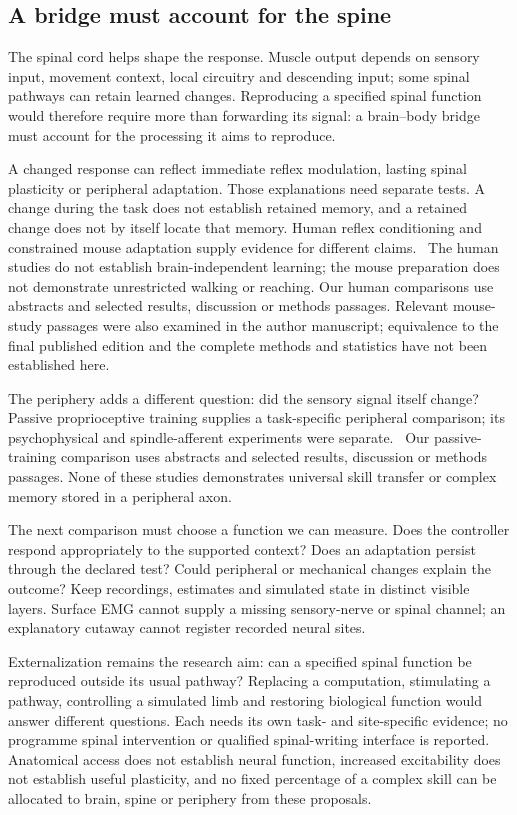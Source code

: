 \subsection{A bridge must account for the spine}

The spinal cord helps shape the response. Muscle output depends on sensory
input, movement context, local circuitry and descending input; some spinal
pathways can retain learned changes. Reproducing a specified spinal function
would therefore require more than forwarding its signal: a brain--body bridge
must account for the processing it aims to reproduce.

A changed response can reflect immediate reflex modulation, lasting spinal
plasticity or peripheral adaptation. Those explanations need separate tests.
A change during the task does not establish retained memory, and a retained
change does not by itself locate that memory. Human reflex conditioning and
constrained mouse adaptation supply evidence for different claims.~\cite{thompson2009retained,thompson2013retained,lavaud2024}
The human studies do not establish brain-independent learning; the mouse
preparation does not demonstrate unrestricted walking or reaching. Our human
comparisons use abstracts and selected results, discussion or methods passages.
Relevant mouse-study passages were also examined in the author manuscript;
equivalence to the final published edition and the complete methods and
statistics have not been established here.

The periphery adds a different question: did the sensory signal itself change?
Passive proprioceptive training supplies a task-specific peripheral comparison;
its psychophysical and spindle-afferent experiments were separate.~\cite{ackerley2022retained}
Our passive-training comparison uses abstracts and selected results, discussion
or methods passages. None of these studies demonstrates universal skill
transfer or complex memory stored in a peripheral axon.

The next comparison must choose a function we can measure. Does the controller
respond appropriately to the supported context? Does an adaptation persist
through the declared test? Could peripheral or mechanical changes explain the
outcome? Keep recordings, estimates and simulated state in distinct visible
layers. Surface EMG cannot supply a missing sensory-nerve or spinal channel;
an explanatory cutaway cannot register recorded neural sites.

Externalization remains the research aim: can a specified spinal function be
reproduced outside its usual pathway? Replacing a computation, stimulating a
pathway, controlling a simulated limb and restoring biological function would
answer different questions. Each needs its own task- and site-specific evidence;
no programme spinal intervention or qualified spinal-writing interface is reported. Anatomical access does not establish
neural function, increased excitability does not establish useful plasticity,
and no fixed percentage of a complex skill can be allocated to brain, spine
or periphery from these proposals.

